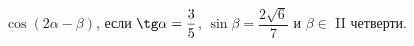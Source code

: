 \begin{ex}[type=simplify_calculate]
	\begin{condition}
		\( \cos(2\alpha-\beta) \), \quad если \( \tg\alpha =\dfrac{3}{5}\), \( \sin\beta=\dfrac{2\sqrt{6}}{7} \) и \( \beta \in \) II четверти.
	\end{condition}
\end{ex}